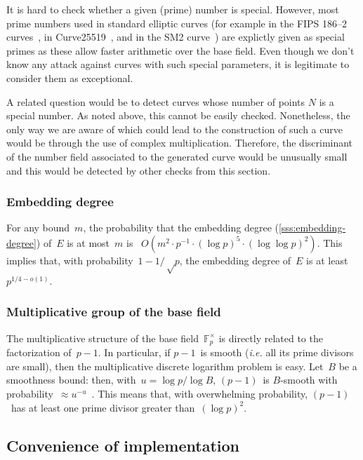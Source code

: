 \documentclass[twocolumn,letterpaper,10pt]{article}
\def\F{\mathbb{F}}
\begin{document}
It is hard to check whether a given (prime) number is special.
However, most prime numbers used in standard elliptic curves
(for example in the FIPS 186--2 curves~\cite{nist2000fips186-2},
in Curve25519~\cite{pkc2006bernstein},
and in the SM2 curve~\cite{oscca2010sm2})
are explictly given as special primes as these allow faster arithmetic
over the base field.
Even though we don't know any attack against curves with such special
parameters, it is legitimate to consider them as exceptional.

A related question would be to detect curves whose number of points $N$
is a special number.
As noted above, this cannot be easily checked.
Nonetheless, the only way we are aware of which could lead to the construction
of such a curve would be through the use of complex multiplication.
Therefore, the discriminant of the number field associated
to the generated curve would be unusually small and this would be detected by
other checks from this section.

\subsubsection{Embedding degree}

For any bound~$m$, the probability that
the embedding degree (\ref{sss:embedding-degree}) of~$E$ is at most~$m$
is~\cite{jc1998bk} $O(m^2 · p^{-1}·(\log p)^5·(\log\log p)^2)$.
This implies that, with probability~$1 - 1/√p$,
the embedding degree of~$E$ is at least~$p^{1/4 - o(1)}$.

\subsubsection{Multiplicative group of the base field}

The multiplicative structure of the base field~$\F_p^{×}$
is directly related to the factorization of~$p-1$.
In particular, if $p-1$~is smooth
(\emph{i.e.} all its prime divisors are small),
then the multiplicative discrete logarithm problem is easy.
Let~$B$ be a smoothness bound: then, with~$u = \log p / \log B$,
$(p-1)$~is $B$-smooth with probability~$≈ u^{-u}$~\cite{jnt1983cep}.
This means that, with overwhelming probability,
$(p-1)$~has at least one prime divisor greater than~$(\log p)^2$.

\subsection{Convenience of implementation}
\label{ss:convenience}
\end{document}
